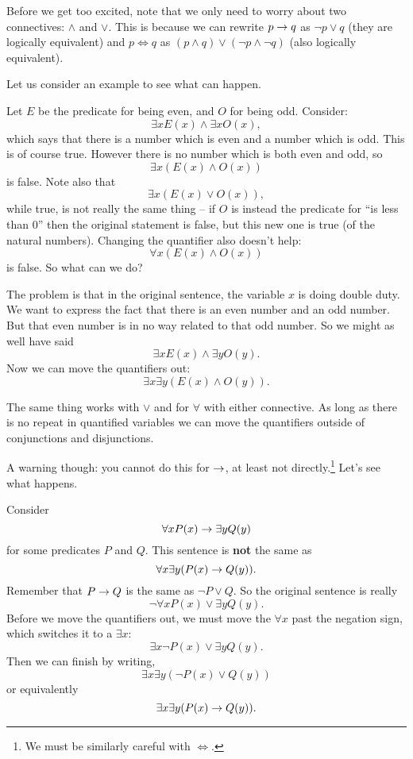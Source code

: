 \documentclass[12pt]{article}
\begin{document}
Before we get too excited, note that we only need to worry about two connectives: $\wedge$ and $\vee$.  This is because we can rewrite $p \rightarrow q$ as $\neg p \vee q$ (they are logically equivalent) and $p \iff q$ as $(p \wedge q) \vee (\neg p \wedge \neg q)$ (also logically equivalent).

Let us consider an example to see what can happen.

\begin{example}
  Let $E$ be the predicate for being even, and $O$ for being odd.  Consider:
\[\exists x E(x) \wedge \exists x O(x),\]
which says that there is a number which is even and a number which is odd.  This is of course true.  However there is no number which is both even and odd, so
\[\exists x (E(x) \wedge O(x))\]
is false.  Note also that
\[\exists x (E(x) \vee O(x)),\]
while true, is not really the same thing -- if $O$ is instead the predicate for ``is less than 0'' then the original statement is false, but this new one is true (of the natural numbers).  Changing the quantifier also doesn't help:
\[\forall x (E(x) \wedge O(x))\]
is false.  So what can we do?

The problem is that in the original sentence, the variable $x$ is doing double duty.  We want to express the fact that there is an even number and an odd number.  But that even number is in no way related to that odd number.  So we might as well have said
\[ \exists x E(x) \wedge \exists y O(y).\]
Now we can move the quantifiers out:
\[\exists x \exists y (E(x) \wedge O(y)).\]
\end{example}

The same thing works with $\vee$ and for $\forall$ with either connective.  As long as there is no repeat in quantified variables we can move the quantifiers outside of conjunctions and disjunctions.

A warning though: you cannot do this for $\rightarrow$, at least not directly.\footnote{We must be similarly careful with $\iff$.}  Let's see what happens.

\begin{example}
Consider
\[ \forall x P(x) \rightarrow \exists y Q(y)\]
for some predicates $P$ and $Q$.  This sentence is \textbf{not} the same as
\[ \forall x \exists y (P(x) \rightarrow Q(y)).\]
Remember that $P \rightarrow Q$ is the same as $\neg P \vee Q$.  So the original sentence is really
\[\neg \forall x P(x) \vee \exists y Q(y).\]
Before we move the quantifiers out, we must move the $\forall x$ past the negation sign, which switches it to a $\exists x$:
\[\exists x \neg P(x) \vee \exists y Q(y).\]
Then we can finish by writing,
\[\exists x \exists y (\neg P(x) \vee Q(y))\]
or equivalently
\[\exists x \exists y (P(x) \rightarrow Q(y)).\]
\end{example}
\end{document}
